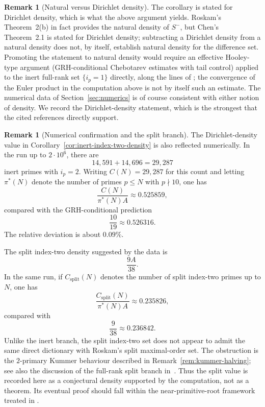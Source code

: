 \documentclass[11pt]{amsart}
\theoremstyle{plain}
\theoremstyle{definition}
\newtheorem{remark}[theorem]{Remark}
\begin{document}
\begin{remark}[Natural versus Dirichlet density]
\label{rem:natural-vs-dirichlet}
The corollary is stated for Dirichlet density, which is what the
above argument yields. Roskam's Theorem~2(b) in fact provides the
natural density of $S^-$, but Chen's Theorem~2.1 is stated for
Dirichlet density; subtracting a Dirichlet density from a natural
density does not, by itself, establish natural density for the
difference set. Promoting the statement to natural density would
require an effective Hooley-type argument (GRH-conditional Chebotarev
estimates with tail control) applied to the inert full-rank set
$\{i_p=1\}$ directly, along the lines of \cite{Murty1983}; the
convergence of the Euler product in the computation above is not by
itself such an estimate. The numerical data of
Section~\ref{sec:numerics} is of course consistent with either notion
of density. We record the Dirichlet-density statement, which is the
strongest that the cited references directly support.
\end{remark}

\begin{remark}[Numerical confirmation and the split branch]
\label{rem:split-status}
The Dirichlet-density value in Corollary~\ref{cor:inert-index-two-density} is also reflected numerically.
In the run up to \(2\cdot10^{6}\), there are
\[
  14{,}591+14{,}696=29{,}287
\]
inert primes with \(i_p=2\).  Writing \(C(N)=29{,}287\) for this count and
letting \(\pi^{*}(N)\) denote the number of primes \(p\le N\) with
\(p\nmid10\), one has
\[
  \frac{C(N)}{\pi^{*}(N)A}\approx0.525859,
\]
compared with the GRH-conditional prediction
\[
  \frac{10}{19}\approx0.526316.
\]
The relative deviation is about \(0.09\%\).

The split index-two density suggested by the data is
\[
  \frac{9A}{38}.
\]
In the same run, if \(C_{\mathrm{split}}(N)\) denotes the number of split
index-two primes up to \(N\), one has
\[
  \frac{C_{\mathrm{split}}(N)}{\pi^{*}(N)A}\approx0.235826,
\]
compared with
\[
  \frac{9}{38}\approx0.236842.
\]
Unlike the inert branch, the split index-two set does not appear to
admit the same direct dictionary with Roskam's split maximal-order set.
The obstruction is the \(2\)-primary Kummer behaviour described in
Remark~\ref{rem:kummer-halving}; see also the discussion of the
full-rank split branch in~\cite{Ghandali2026Preprint}.  Thus the split value is recorded
here as a conjectural density supported by the computation, not as a
theorem.  Its eventual proof should fall within the near-primitive-root
framework treated in
\cite{LenstraMoreeStevenhagen2014,Palenstijn2014,Kataoka2003}.
\end{remark}
\end{document}
